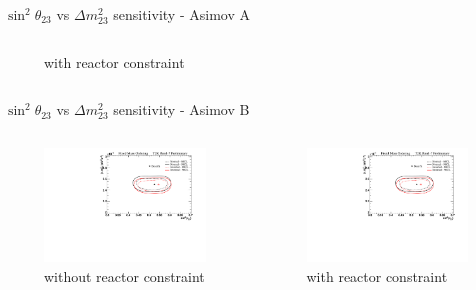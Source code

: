 \documentclass{beamer}
\newcommand{\sinsqthetatwothree}{$\sin^2\theta_{23}$\xspace}
\newcommand{\dmsqtwothree}{$\Delta m^2_{23}$\xspace}
\begin{document}
\begin{frame}{\sinsqthetatwothree vs \dmsqtwothree sensitivity - Asimov A}
\begin{columns}
\begin{column}{0.5\paperwidth}
\begin{figure}
				\caption*{with reactor constraint}
			\end{figure}
		\end{column}
	\end{columns}
\end{frame}

\begin{frame}{\sinsqthetatwothree vs \dmsqtwothree sensitivity - Asimov B}
	\centering
	\begin{columns}
		\begin{column}{0.5\paperwidth}
			\begin{figure}
				\includegraphics[trim={0cm 0cm 0cm 0cm}, clip, scale=0.33] {images/sensitivity/th23_dmsq23_global_t2k}
				\caption*{without reactor constraint}
			\end{figure}
		\end{column}
		\begin{column}{0.5\paperwidth}
			\begin{figure}
				\includegraphics[trim={0cm 0cm 0cm 0cm}, clip, scale=0.33] {images/sensitivity/th23_dmsq23_global_t2k}
				\caption*{with reactor constraint}
			\end{figure}
		\end{column}
	\end{columns}
\end{frame}
\end{document}
